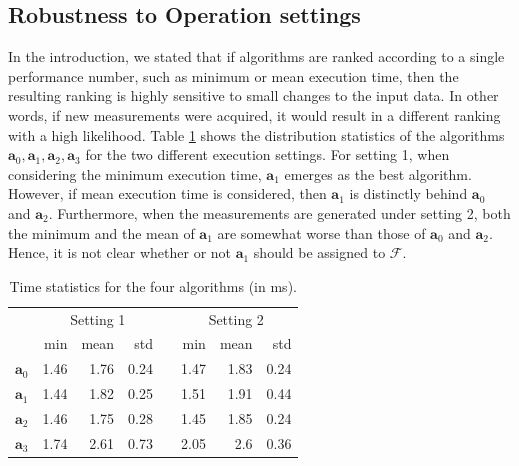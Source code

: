 \documentclass[conference]{IEEEtran}
\newcommand{\p}[1]{{\color{blue} Pdj: #1}}
\begin{document}
\subsection{Robustness to Operation settings}

In the introduction, we stated that if algorithms are ranked according to a single performance number, such as minimum or mean
execution time, then the resulting ranking is highly sensitive to small changes to the input data. In other words, if
new measurements were acquired, it would result in a different ranking with a high likelihood.
Table \ref{tab:2} shows the distribution statistics of the algorithms $\mathbf{a}_0, \mathbf{a}_1, \mathbf{a}_2,
\mathbf{a}_3$ for the two different execution settings. For setting 1, when considering the minimum execution time,
$\mathbf{a}_1$ emerges as the best algorithm. However, if mean execution time is considered, then $\mathbf{a}_1$ is
distinctly behind $\mathbf{a}_0$ and $\mathbf{a}_2$. Furthermore, when the measurements are generated under setting 2, both the minimum and the mean of $\mathbf{a}_1$ are somewhat
worse than those of $\mathbf{a}_0$ and $\mathbf{a}_2$.
Hence, it is not clear whether or not $\mathbf{a}_1$ should be assigned to $\mathcal{F}$.
\begin{table}[h!]
	\begin{center}
		\renewcommand{\arraystretch}{1.2}
		\begin{tabular}{@{}r rrr c rrr@{}}
			\toprule
			& \multicolumn{3}{c}{Setting 1} & & \multicolumn{3}{c}{Setting 2} \\
			\cmidrule{2-4} \cmidrule{6-8}
			& min & mean & std && min & mean & std \\
			\midrule
			{$\mathbf{a}_0$ \hfill }& 1.46  & 1.76  & 0.24  && 1.47  & 1.83  & 0.24  \\
			{$\mathbf{a}_1$ } & 1.44  & 1.82   & 0.25  && 1.51  & 1.91   & 0.44  \\
			{$\mathbf{a}_2$ } & 1.46  & 1.75  & 0.28  && 1.45  & 1.85  & 0.24  \\
			{$\mathbf{a}_3$ } & 1.74  & 2.61  & 0.73  && 2.05  & 2.6  & 0.36  \\
			\bottomrule
		\end{tabular}
		\caption{Time statistics for the four algorithms (in ms).}
		\label{tab:2}
	\end{center}
\end{table}
\end{document}
